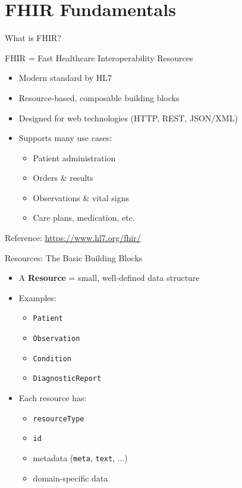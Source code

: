 \documentclass[aspectratio=1610]{beamer}
\begin{document}
	\section{FHIR Fundamentals}
	
	\begin{frame}{What is FHIR?}
		\begin{block}{FHIR = Fast Healthcare Interoperability Resources}
			\begin{itemize}
				\item Modern standard by HL7
				\item Resource-based, composable building blocks
				\item Designed for web technologies (HTTP, REST, JSON/XML)
				\item Supports many use cases:
				\begin{itemize}
					\item Patient administration
					\item Orders \& results
					\item Observations \& vital signs
					\item Care plans, medication, etc.
				\end{itemize}
			\end{itemize}
		\end{block}
		\vspace{0.5em}
		\small Reference: \url{https://www.hl7.org/fhir/}
	\end{frame}
	
	\begin{frame}{Resources: The Basic Building Blocks}
		\begin{itemize}
			\item A \textbf{Resource} = small, well-defined data structure
			\item Examples:
			\begin{itemize}
				\item \texttt{Patient}
				\item \texttt{Observation}
				\item \texttt{Condition}
				\item \texttt{DiagnosticReport}
			\end{itemize}
			\item Each resource has:
			\begin{itemize}
				\item \texttt{resourceType}
				\item \texttt{id}
				\item metadata (\texttt{meta}, \texttt{text}, ...)
				\item domain-specific data
			\end{itemize}
		\end{itemize}
	\end{frame}
	
\end{document}
